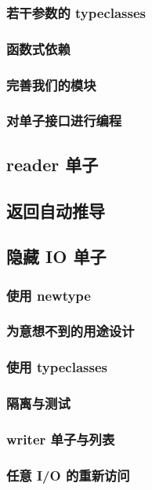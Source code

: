 \documentclass[./main.tex]{subfiles}
\begin{document}
\subsubsection*{若干参数的 typeclasses}

\subsubsection*{函数式依赖}

\subsubsection*{完善我们的模块}

\subsubsection*{对单子接口进行编程}

\subsection*{reader 单子}

\subsection*{返回自动推导}

\subsection*{隐藏 IO 单子}

\subsubsection*{使用 newtype}

\subsubsection*{为意想不到的用途设计}

\subsubsection*{使用 typeclasses}

\subsubsection*{隔离与测试}

\subsubsection*{writer 单子与列表}

\subsubsection*{任意 I/O 的重新访问}
\end{document}
